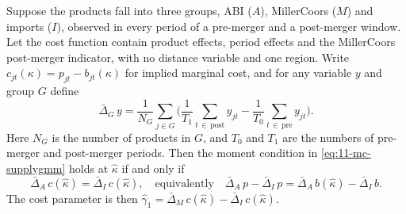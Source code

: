 \begin{proposition}\label{prop:11-mc-did}
Suppose the products fall into three groups, ABI ($A$), MillerCoors ($M$) and imports ($I$), observed in every period
of a pre-merger and a post-merger window. Let the cost function contain product effects, period effects and the
MillerCoors post-merger indicator, with no distance variable and one region. Write $c_{jt}(\kappa) = p_{jt} -
b_{jt}(\kappa)$ for implied marginal cost, and for any variable $y$ and group $G$ define
\begin{equation*}
  \bar\Delta_G\, y = \frac{1}{N_G}\sum_{j\in G}\Big(\frac{1}{T_1}\sum_{t\,\in\,\text{post}} y_{jt} -
  \frac{1}{T_0}\sum_{t\,\in\,\text{pre}} y_{jt}\Big).
\end{equation*}
Here $N_G$ is the number of products in $G$, and $T_0$ and $T_1$ are the numbers of pre-merger and post-merger
periods. Then the moment condition in \eqref{eq:11-mc-supplygmm} holds at $\hat\kappa$ if and only if
\begin{equation}\label{eq:11-mc-did}
  \bar\Delta_A\, c(\hat\kappa) = \bar\Delta_I\, c(\hat\kappa), \quad\text{equivalently}\quad
  \bar\Delta_A\, p - \bar\Delta_I\, p = \bar\Delta_A\, b(\hat\kappa) - \bar\Delta_I\, b .
\end{equation}
The cost parameter is then $\hat\gamma_1 = \bar\Delta_M\, c(\hat\kappa) - \bar\Delta_I\, c(\hat\kappa)$.
\end{proposition}

